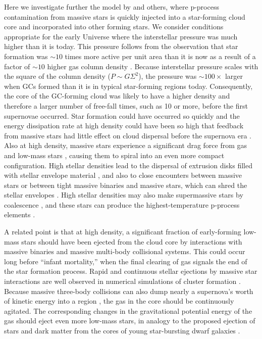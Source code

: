 \documentclass[12pt,preprint]{aastex}
\begin{document}
Here we investigate further the model by \cite{prantzos06} and others, where
p-process contamination from massive stars is quickly injected into a star-forming
cloud core and incorporated into other forming stars. We consider conditions
appropriate for the early Universe where the interstellar pressure was much higher
than it is today. This pressure follows from the observation that star formation
was $\sim10$ times more active per unit area than it is now \citep{genzel10} as a
result of a factor of $\sim10$ higher gas column density \citep{tacconi10,daddi10}.
Because interstellar pressure scales with the square of the column density ($P\sim
G\Sigma^2$), the pressure was $\sim100\times$ larger when GCs formed than it is in
typical star-forming regions today. Consequently, the core of the GC-forming cloud
was likely to have a higher density and therefore a larger number of free-fall
times, such as 10 or more, before the first supernovae occurred. Star formation
could have occurred so quickly and the energy dissipation rate at high density
could have been so high that feedback from massive stars had little effect on cloud
dispersal before the supernova era \citep[e.g.,][]{wunsch15}. Also at high density,
massive stars experience a significant drag force from gas and low-mass stars
\citep{ostriker99}, causing them to spiral into an even more compact configuration.
High stellar densities lead to the dispersal of extrusion disks filled with stellar
envelope material \citep{prantzos06}, and also to close encounters between massive
stars or between tight massive binaries and massive stars, which can shred the
stellar envelopes \citep{gaburov10}. High stellar densities may also make
supermassive stars by coalescence \citep{ebisuzaki01,bally05}, and these stars can
produce the highest-temperature p-process elements \citep{denis15}.

A related point is that at high density, a significant fraction of early-forming
low-mass stars should have been ejected from the cloud core by interactions with
massive binaries and massive multi-body collisional systems. This could occur long
before ``infant mortality,'' when the final clearing of gas signals the end of the
star formation process. Rapid and continuous stellar ejections by massive star
interactions are well observed in numerical simulations of cluster formation
\citep{reipurth01,bate05,fujii13}. Because massive three-body collisions can also
dump nearly a supernova's worth of kinetic energy into a region
\citep{gaburov10,umbreit08}, the gas in the core should be continuously agitated.
The corresponding changes in the gravitational potential energy of the gas should
eject even more low-mass stars, in analogy to the proposed ejection of stars and
dark matter from the cores of young star-bursting dwarf galaxies
\citep{governato12,elbadry16}.
\end{document}
